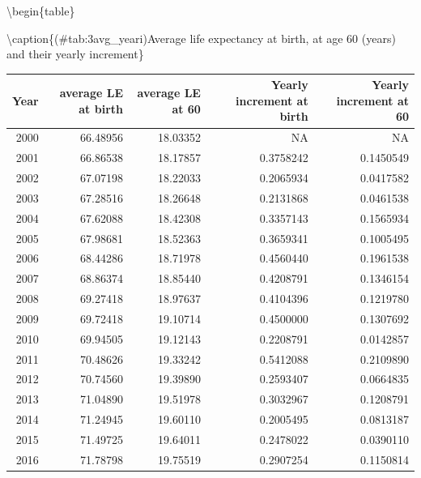 \documentclass[11pt,a4paper,]{article}
\begin{document}
\textbackslash{}begin\{table\}

\textbackslash{}caption\{(\#tab:3avg\_yeari)Average life expectancy at birth, at age 60 (years) and their yearly increment\}
\centering

\begin{tabular}[t]{r|r|r|r|r}
\hline
Year & average LE at birth & average LE at 60 & Yearly increment at birth & Yearly increment at 60\\
\hline
2000 & 66.48956 & 18.03352 & NA & NA\\
\hline
2001 & 66.86538 & 18.17857 & 0.3758242 & 0.1450549\\
\hline
2002 & 67.07198 & 18.22033 & 0.2065934 & 0.0417582\\
\hline
2003 & 67.28516 & 18.26648 & 0.2131868 & 0.0461538\\
\hline
2004 & 67.62088 & 18.42308 & 0.3357143 & 0.1565934\\
\hline
2005 & 67.98681 & 18.52363 & 0.3659341 & 0.1005495\\
\hline
2006 & 68.44286 & 18.71978 & 0.4560440 & 0.1961538\\
\hline
2007 & 68.86374 & 18.85440 & 0.4208791 & 0.1346154\\
\hline
2008 & 69.27418 & 18.97637 & 0.4104396 & 0.1219780\\
\hline
2009 & 69.72418 & 19.10714 & 0.4500000 & 0.1307692\\
\hline
2010 & 69.94505 & 19.12143 & 0.2208791 & 0.0142857\\
\hline
2011 & 70.48626 & 19.33242 & 0.5412088 & 0.2109890\\
\hline
2012 & 70.74560 & 19.39890 & 0.2593407 & 0.0664835\\
\hline
2013 & 71.04890 & 19.51978 & 0.3032967 & 0.1208791\\
\hline
2014 & 71.24945 & 19.60110 & 0.2005495 & 0.0813187\\
\hline
2015 & 71.49725 & 19.64011 & 0.2478022 & 0.0390110\\
\hline
2016 & 71.78798 & 19.75519 & 0.2907254 & 0.1150814\\
\hline
\end{tabular}
\end{document}
